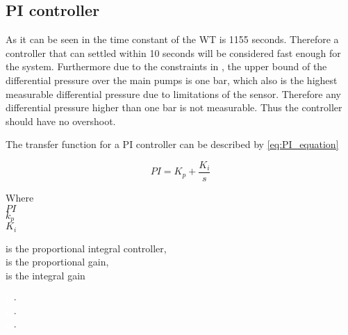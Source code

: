 \vspace{-0.5cm}




\subsection*{PI controller}

As it can be seen in  the time constant of the WT is 1155 seconds. Therefore a controller that can settled within 10 seconds will be considered fast enough for the system.
Furthermore due to the constraints in , the upper bound of the differential pressure over the main pumps is one bar, which also is the highest measurable differential pressure due to limitations of the sensor. Therefore any differential pressure higher than one bar is not measurable. Thus the controller should have no overshoot. 
 
The transfer function for a PI controller can be described by \eqref{eq:PI_equation}

\begin{equation}
	PI = K_p + \frac{K_i}{s}
	\label{eq:PI_equation}
\end{equation}

\begin{minipage}[t]{0.20\textwidth}
Where\\
\hspace*{8mm} $ PI $ \\
\hspace*{8mm} $ k_p $  \\
\hspace*{8mm} $ K_i $  
\end{minipage}
\begin{minipage}[t]{0.68\textwidth}
\vspace*{2mm}
is the proportional integral controller, \\
is the proportional gain, \\
is the integral gain
\end{minipage}
\begin{minipage}[t]{0.10\textwidth}
\vspace*{1.8mm}
\textcolor{White}{te}$\unit{\cdot}$\\
\textcolor{White}{te}$\unit{\cdot}$\\
\textcolor{White}{te}$\unit{\cdot}$
\end{minipage}


